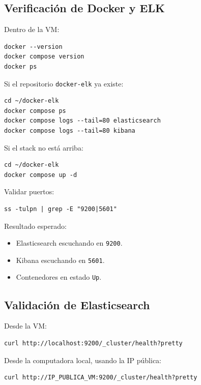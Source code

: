 \documentclass[
  coursetitle={Cómputo Nube y Tecnologías Emergentes},
  coursehours={96},
  coursedate={Verano 2026},
  doctype={Práctica},
  otherlangs={english,french},
  authorname={Lázaro},
  authorsurname={Bustio-Martínez},
  authortitle={PhD},
  role={Profesor Investigador},
  email={lbustio@inaoe.mx},
  phone={5559504000},
  ext={7459},
  institution={Instituto Nacional de Astrofísica, Óptica y Electrónica (INAOE)},
  department={Maestría en Ciencias en Tecnologías de Seguridad},
  address={Luis Enrique Erro 1, Sta. Ma. Tonantzintla, San Andrés Cholula, CP 72840, Puebla, México},
  margin={0.5in}
]{../../lbustio_lecture_notes}
\begin{document}
\subsection{Verificación de Docker y ELK}

Dentro de la VM:

\begin{lstlisting}
docker --version
docker compose version
docker ps
\end{lstlisting}

Si el repositorio \texttt{docker-elk} ya existe:

\begin{lstlisting}
cd ~/docker-elk
docker compose ps
docker compose logs --tail=80 elasticsearch
docker compose logs --tail=80 kibana
\end{lstlisting}

Si el stack no está arriba:

\begin{lstlisting}
cd ~/docker-elk
docker compose up -d
\end{lstlisting}

Validar puertos:

\begin{lstlisting}
ss -tulpn | grep -E "9200|5601"
\end{lstlisting}

Resultado esperado:

\begin{itemize}
    \item Elasticsearch escuchando en \texttt{9200}.
    \item Kibana escuchando en \texttt{5601}.
    \item Contenedores en estado \texttt{Up}.
\end{itemize}

\subsection{Validación de Elasticsearch}

Desde la VM:

\begin{lstlisting}
curl http://localhost:9200/_cluster/health?pretty
\end{lstlisting}

Desde la computadora local, usando la IP pública:

\begin{lstlisting}
curl http://IP_PUBLICA_VM:9200/_cluster/health?pretty
\end{lstlisting}
\end{document}
